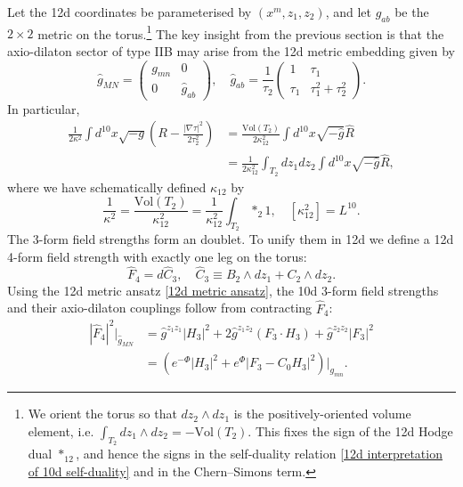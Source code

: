 Let the 12d coordinates be parameterised by $(x^m,z_1,z_2)$, and let $\widehat{g}_{ab}$ be the $2\times 2$ metric on the torus.\footnote{
We orient the torus so that $dz_2\wedge dz_1$ is the positively-oriented volume element, i.e. $\int_{T_2}dz_1\wedge dz_2 = -\mathrm{Vol}(T_2)$. This fixes the sign of the 12d Hodge dual $*_{12}$, and hence the signs in the self-duality relation \eqref{12d interpretation of 10d self-duality} and in the Chern--Simons term.
}
The key insight from the previous section is that the axio-dilaton sector of type IIB may arise from the 12d metric embedding given by
\begin{equation}
\widehat{g}_{MN}=\begin{pmatrix}
g_{mn} & 0 \\
0 &\widehat{g}_{ab}
\end{pmatrix},\quad
\widehat{g}_{ab}
=\frac{1}{\tau_2}\begin{pmatrix}
1& \tau_1\\
\tau_1 & \tau_1^2+\tau_2^2
\end{pmatrix}.
\label{12d metric ansatz}
\end{equation}
In particular,
\begin{equation}
\begin{aligned}
\frac{1}{2\kappa^2}\int d^{10}x\sqrt{-g}\left(
R - \frac{|\nabla \tau|^2}{2\tau_2^2}
\right)
&=
\frac{\mathrm{Vol}(T_2)}{2\kappa_{12}^2}\int d^{10}x \sqrt{-\widehat{g}} \widehat{R}\\
&=\frac{1}{2\kappa_{12}^2}\int_{T_2}dz_1 dz_2\int d^{10}x\sqrt{-\widehat{g}}\widehat{R},
\end{aligned}
\label{axio-dilaton 12d uplift}
\end{equation}
where we have schematically defined $\kappa_{12}$ by 
\begin{equation}
\frac{1}{\kappa^2} = \frac{\mathrm{Vol}(T_2)}{\kappa_{12}^2}
=\frac{1}{\kappa_{12}^2}\int_{T_2}*_2 1,\quad
[\kappa_{12}^2] = L^{10}.
\end{equation}
The 3-form field strengths form an \SLR{} doublet.
To unify them in 12d we define a 12d 4-form field strength with exactly one leg on the torus:
\begin{equation}
\widehat{F}_4=d\widehat C_3,\quad
\widehat C_3 \equiv B_2\wedge dz_1 + C_2\wedge dz_2.
\end{equation}
Using the 12d metric ansatz \eqref{12d metric ansatz}, the 10d 3-form field strengths and their axio-dilaton couplings follow from contracting $\widehat F_4$:
\begin{equation}
\begin{aligned}
|\widehat{F}_4|^2\bigg|_{\widehat{g}_{MN}}
&=\widehat{g}^{z_1 z_1}|H_3|^2+2\widehat{g}^{z_1 z_2}(F_3\cdot H_3)+\widehat{g}^{z_2 z_2}|F_3|^2\\
&=\left(
e^{-\Phi}|H_3|^2 + e^\Phi|F_3-C_0H_3|^2
\right)\bigg|_{g_{mn}}.
\end{aligned}
\end{equation}
